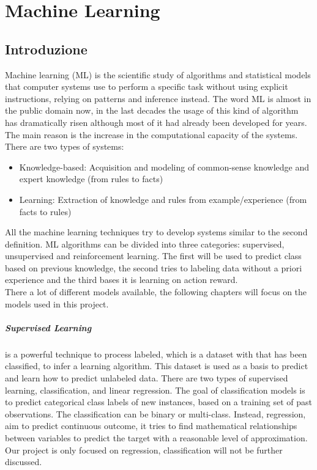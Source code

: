 \documentclass[%
    corpo=12pt,
    twoside,
    oldstyle,
    autoretitolo,
    greek,
    evenboxes,
]{toptesi}
\begin{document}

\chapter{Machine Learning}
\label{chap:ml}
\section{Introduzione}
Machine learning (ML) is the scientific study of algorithms and statistical models that computer systems use to perform a specific task without using explicit instructions, relying on patterns and inference instead. The word ML is almost in the public domain now, in the last decades the usage of this kind of algorithm has dramatically risen although most of it had already been developed for years. The main reason is the increase in the computational capacity of the systems.\\
There are two types of systems:
\begin{itemize}
  \item Knowledge-based: Acquisition and modeling of common-sense knowledge and expert knowledge (from rules to facts)
  \item Learning: Extraction of knowledge and rules from example/experience (from facts to rules)
\end{itemize}
All the machine learning techniques try to develop systems similar to the second definition. ML algorithms can be divided into three categories: supervised, unsupervised and reinforcement learning. The first will be used to predict class based on previous knowledge, the second tries to labeling data without a priori experience and the third bases it is learning on action reward.\\
There a lot of different models available, the following chapters will focus on the models used in this project.

\paragraph{Supervised Learning}
is a powerful technique to process labeled, which is a dataset with that has been classified, to infer a learning algorithm. This dataset is used as a basis to predict and learn how to predict unlabeled data. There are two types of supervised learning, classification, and linear regression. The goal of classification models is to predict categorical class labels of new instances, based on a training set of past observations. The classification can be binary or multi-class. Instead, regression, aim to predict continuous outcome, it tries to find mathematical relationships between variables to predict the target with a reasonable level of approximation. Our project is only focused on regression, classification will not be further discussed.
\end{document}

